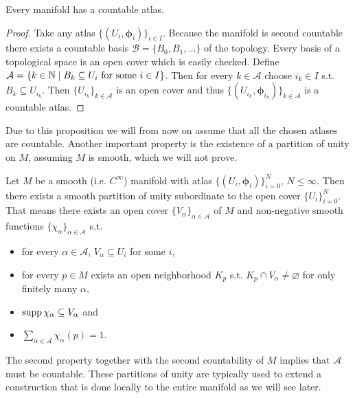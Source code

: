 \documentclass[../master_thesis.tex]{subfiles}
\begin{document}
\begin{proposition}
    Every manifold has a countable atlas. 
\end{proposition}
\begin{proof}
    Take any atlas $\{(U_i, \boldsymbol{\phi}_i) \}_{i \in I}$. Because the manifold is 
    second countable there exists a countable basis
    $\mathcal{B} = \{ B_0, B_1, ... \}$ of the topology. Every basis of a topological space is 
    an open cover which is easily checked. Define 
    $\mathcal{A} = \{ k \in \mathbb{N} \mid B_k \subseteq U_i \text{ for some 
    $i \in I$} \}$. Then for every $k \in \mathcal{A}$ choose 
    $i_k \in I$ s.t. $B_k \subseteq U_{i_k}$. Then $\{U_{i_k}\}_{k\in \mathcal{A}}$ 
    is an open cover and thus $\{ (U_{i_k}, \boldsymbol{\phi}_{i_k}) \}_{k \in \mathcal{A}}$
    is a countable atlas.
\end{proof}
Due to this proposition we will from now on assume that all the chosen atlases
are countable.
Another important property is the existence of a partition of unity on $M$, 
assuming $M$ is smooth, which we will not prove.

\begin{theorem}\label{thm:partition_of_unity}
    Let $M$ be a smooth (i.e. $C^\infty$) manifold with atlas 
    $\{(U_i, \boldsymbol{\phi}_i)\}_{i=0}^N$, $N \leq \infty$. Then there exists a smooth
    partition of unity subordinate to the open cover $\{U_i\}_{i=0}^N$.
    That means there exists an open cover $\{ V_\alpha \}_{\alpha \in \mathcal{A}}$ of $M$ and
    non-negative smooth functions $\{ \chi_\alpha \}_{\alpha \in \mathcal{A}}$
    s.t. 
    \begin{itemize}
        \item for every $\alpha \in \mathcal{A}$, $V_\alpha \subseteq U_i$ for some $i$,
        \item for every $p \in M$ exists an open neighborhood $K_p$ s.t. 
                $K_p \cap V_\alpha \neq \varnothing$ for only finitely many $\alpha$,
        \item $\operatorname{supp} \chi_\alpha \subseteq V_\alpha$ and
        \item $\sum_{\alpha \in \mathcal{A}} \chi_\alpha(p) = 1$.
    \end{itemize}
\end{theorem}
The second property together with the second countability of $M$ implies that 
$\mathcal{A}$ must be countable.
These partitions of unity are typically used to extend a construction that 
is done locally to the entire manifold as we will see later.
\end{document}
